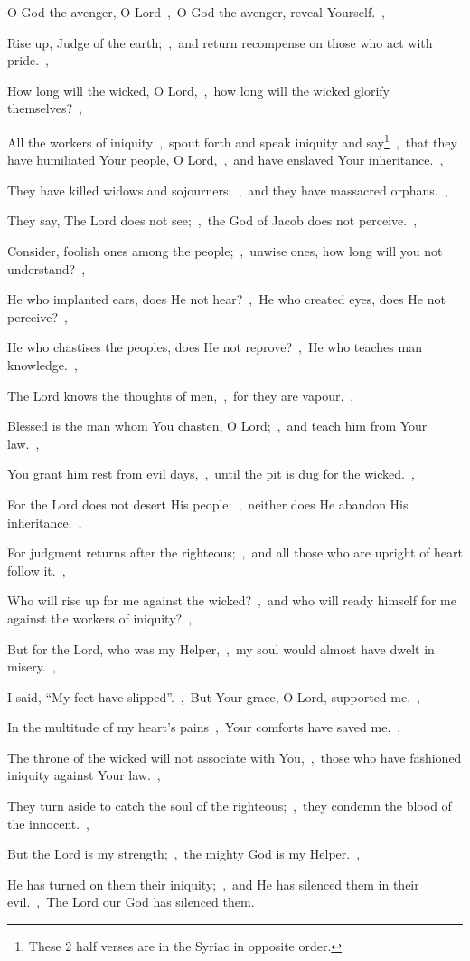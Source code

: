 \documentclass[12pt,twoside,a5paper]{article}
\begin{document}
\begin{normalparskip}
  O God the avenger, O Lord~\sep\ O God the avenger, reveal Yourself.~\sep


  Rise up, Judge of the earth;~\sep\ and return recompense on those who act with pride.~\sep

  How long will the wicked, O Lord,~\sep\ how long will the wicked glorify themselves?~\sep

  All the workers of iniquity~\sep\ spout forth and speak iniquity and say\footnote{These 2 half verses are in the Syriac in opposite order.}~\sep\ that they have humiliated Your people, O Lord,~\sep\ and have enslaved Your inheritance.~\sep

  They have killed widows and sojourners;~\sep\ and they have massacred orphans.~\sep

  They say, The Lord does not see;~\sep\ the God of Jacob does not perceive.~\sep

  Consider, foolish ones among the people;~\sep\ unwise ones, how long will you not understand?~\sep

  He who implanted ears, does He not hear?~\sep\ He who created eyes, does He not perceive?~\sep

  He who chastises the peoples, does He not reprove?~\sep\ He who teaches man knowledge.~\sep

  The Lord knows the thoughts of men,~\sep\ for they are vapour.~\sep

  Blessed is the man whom You chasten, O Lord;~\sep\ and teach him from Your law.~\sep

  You grant him rest from evil days,~\sep\ until the pit is dug for the wicked.~\sep

  For the Lord does not desert His people;~\sep\ neither does He abandon His inheritance.~\sep

  For judgment returns after the righteous;~\sep\ and all those who are upright of heart follow it.~\sep

  Who will rise up for me against the wicked?~\sep\ and who will ready himself for me against the workers of iniquity?~\sep

  But for the Lord, who was my Helper,~\sep\ my soul would almost have dwelt in misery.~\sep

  I said, ``My feet have slipped''.~\sep\ But Your grace, O Lord, supported me.~\sep

  In the multitude of my heart's pains~\sep\ Your comforts have saved me.~\sep

  The throne of the wicked will not associate with You,~\sep\ those who have fashioned iniquity against Your law.~\sep

  They turn aside to catch the soul of the righteous;~\sep\ they condemn the blood of the innocent.~\sep

  But the Lord is my strength;~\sep\ the mighty God is my Helper.~\sep

  He has turned on them their iniquity;~\sep\ and He has silenced them in their evil.~\sep\ The Lord our God has silenced them.
\end{normalparskip}
\end{document}
